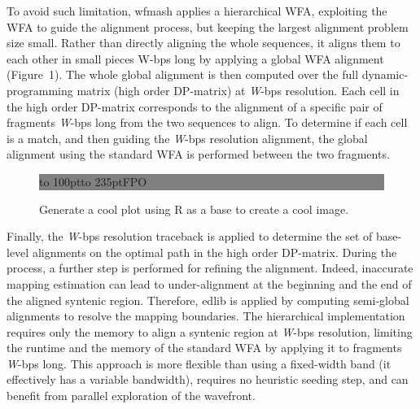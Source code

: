 \documentclass{bioinfo}
\begin{document}
    To avoid such limitation, wfmash applies a hierarchical WFA, exploiting the WFA to guide the alignment
    process, but keeping the largest alignment problem size small. Rather than directly aligning the whole
    sequences, it aligns them to each other in small pieces W-bps long by applying a global WFA alignment
    (Figure~1\vphantom{\ref{fig:1}}). The whole global alignment is then computed over the full
    dynamic-programming matrix (high order DP-matrix) at \textit{W}-bps resolution.
    Each cell in the high order DP-matrix corresponds to the alignment of a specific pair of fragments
    \textit{W}-bps long from the two sequences to align. To determine if each cell is a match, and then guiding the
    \textit{W}-bps resolution alignment, the global alignment using the standard WFA is performed between the
    two fragments.


    \begin{figure}[!tpb]%
        \fboxsep=0pt\colorbox{gray}{
            \begin{minipage}[t]{235pt}
                \vbox to 100pt{\vfill\hbox to
                235pt{\hfill\fontsize{24pt}{24pt}\selectfont FPO\hfill}\vfill}
            \end{minipage}}
        \caption{Generate a cool plot using R as a base to create a cool image.}\label{fig:1}
    \end{figure}


    Finally, the \textit{W}-bps resolution traceback is applied to determine the set of base-level alignments
    on the optimal path in the high order DP-matrix. During the process, a further step is performed for
    refining the alignment. Indeed, inaccurate mapping estimation can lead to under-alignment at the beginning
    and the end of the aligned syntenic region. Therefore, edlib is applied by computing semi-global alignments
    to resolve the mapping boundaries.
    The hierarchical implementation requires only the memory to align a syntenic region at \textit{W}-bps resolution,
    limiting the runtime and the memory of the standard WFA by applying it to fragments \textit{W}-bps long.
    This approach is more flexible than using a fixed-width band (it effectively has a variable bandwidth), requires
    no heuristic seeding step, and can benefit from parallel exploration of the wavefront.
\end{document}
